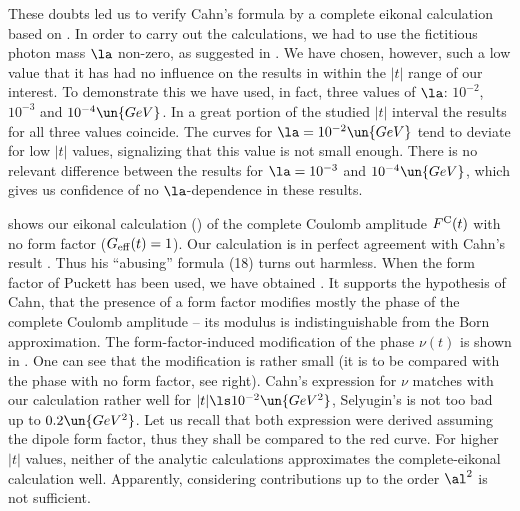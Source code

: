 These doubts led us to verify Cahn's formula by a complete eikonal calculation based on . In order to carry out the calculations, we had to use the fictitious photon mass $\la$ non-zero, as suggested in . We have chosen, however, such a low value that it has had no influence on the results in within the $|t|$ range of our interest. To demonstrate this we have used, in fact, three values of $\la$: $10^{-2}$, $10^{-3}$ and $10^{-4}\un{GeV}$. In a great portion of the studied $|t|$ interval the results for all three values coincide. The curves for $\la = 10^{-2} \un{GeV}$ tend to deviate for low $|t|$ values, signalizing that this value is not small enough. There is no relevant difference between the results for $\la = 10^{-3}$ and $10^{-4}\un{GeV}$, which gives us confidence of no $\la$-dependence in these results.


\bmfig
{}
%
\emfig

\eject
{} shows our eikonal calculation () of the complete Coulomb amplitude $F^{\rm C}(t)$ with no form factor ($G_{\rm eff}(t) = 1$). Our calculation is in perfect agreement with Cahn's result . Thus his ``abusing'' formula (18) turns out harmless. When the form factor of Puckett has been used, we have obtained . It supports the hypothesis of Cahn, that the presence of a form factor modifies mostly the phase of the complete Coulomb amplitude -- its modulus is indistinguishable from the Born approximation. The form-factor-induced modification of the phase $\nu(t)$ is shown in . One can see that the modification is rather small (it is to be compared with the phase with no form factor, see  right). Cahn's expression for $\nu$ matches with our calculation rather well for $|t| \ls 10^{-2}\un{GeV^2}$, Selyugin's is not too bad up to $0.2\un{GeV^2}$. Let us recall that both expression were derived assuming the dipole form factor, thus they shall be compared to the red curve. For higher $|t|$ values, neither of the analytic calculations approximates the complete-eikonal calculation well. Apparently, considering contributions up to the order $\al^2$ is not sufficient.


